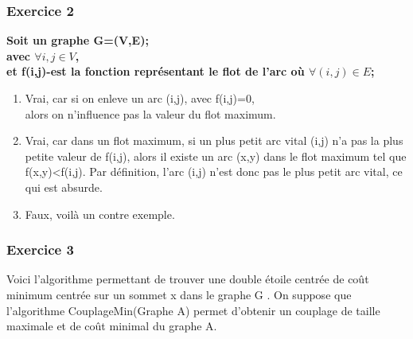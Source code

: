 \documentclass[]{article}
\begin{document}
\subsubsection{Exercice 2}

\textbf{Soit un graphe G=(V,E);\\avec $\forall i,j \in V$,\\
et f(i,j)-est la fonction représentant le flot de l'arc où $\forall (i,j)\in E$;\\}

\begin{enumerate}


\item Vrai, car si on enleve un arc (i,j), avec f(i,j)=0,\\ alors on n'influence pas la valeur du flot maximum.

\item Vrai, car dans un flot maximum, si un plus petit arc vital (i,j) n'a pas la plus petite valeur de f(i,j), alors il existe un arc (x,y) dans le flot maximum tel que f(x,y)<f(i,j). Par définition, l'arc (i,j) n'est donc pas le plus petit arc vital, ce qui est absurde.
\item Faux, voilà un contre exemple.


\usetikzlibrary{arrows}
\thispagestyle{empty}
\begin{center}
\end{center}
 
\end{enumerate} 

\subsubsection{Exercice 3}
Voici l'algorithme permettant de trouver une double étoile centrée de coût minimum centrée sur un sommet x dans le graphe G . On suppose que l'algorithme CouplageMin(Graphe A) permet d'obtenir un couplage de taille maximale et de coût minimal du graphe A. \\
\end{document}
